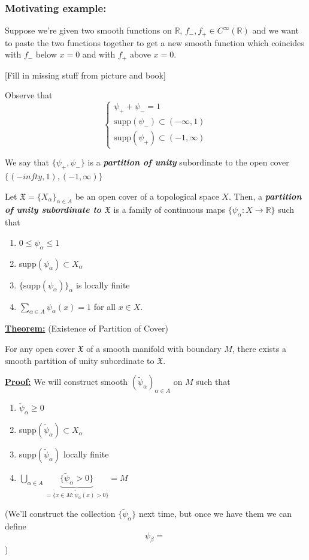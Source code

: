 \documentclass{article}
\newcommand{\R}{\mathbb{R}}
\begin{document}
\subsubsection*{Motivating example:}
Suppose we're given two smooth functions on $\R$, $f_-, f_+ \in C^{\infty}(\R)$ and we want to paste the two functions together to get a new smooth function which coincides with $f_-$ below $x = 0$ and with $f_+$ above $x = 0$.

\vskip 1cm
[Fill in missing stuff from picture and book]

\vskip 1cm
Observe that 
\[ \begin{cases}
  \psi_+ + \psi_- = 1 \\
  \text{supp}(\psi_-) \subset (-\infty, 1) \\
  \text{supp}(\psi_+) \subset (-1, \infty) 
\end{cases} \]

We say that $\{\psi_+, \psi_-\}$ is a \emph{\textbf{partition of unity}} subordinate to the open cover $\{ (-infty, 1), (-1, \infty) \}$

\vskip 1cm
\begin{mathdefinitionbox}{}
  Let $\mathfrak{X} = \{X_{\alpha}\}_{\alpha \in A}$ be an open cover of a topological space $X$. Then, a \emph{\textbf{partition of unity subordinate to $\mathfrak{X}$}} is a family of continuous maps $\{\psi_{\alpha} : X \rightarrow \R \}$ such that 
  \begin{enumerate}
    \item $0 \leq \psi_{\alpha} \leq 1$
    \item supp$(\psi_{\alpha}) \subset X_{\alpha}$
    \item $\{\text{supp}(\psi_{\alpha})\}_{\alpha}$ is locally finite
    \item $\sum_{\alpha \in A} \psi_{\alpha}(x) = 1$ for all $x \in X$.
  \end{enumerate}  
\end{mathdefinitionbox}

\vskip 1cm
\begin{dottedbox}
  \underline{\textbf{Theorem:}} (Existence of Partition of Cover)
  
  For any open cover $\mathfrak{X}$ of a smooth manifold with boundary $M$, there exists a smooth partition of unity subordinate to $\mathfrak{X}$.
\end{dottedbox}

\vskip 0.5cm
\underline{\textbf{Proof:}} We will construct smooth $(\tilde{\psi}_{\alpha})_{\alpha \in A}$ on $M$ such that 
\begin{enumerate}
  \item $\tilde{\psi}_{\alpha} \geq 0$ 
  \item supp$(\tilde{\psi}_{\alpha}) \subset X_{\alpha}$
  \item supp$(\tilde{\psi}_{\alpha})$ locally finite
  \item $\bigcup_{\alpha \in A} \underbrace{\{ \tilde{\psi}_{\alpha} > 0 \}}_{ = \{x \in M : \tilde{\psi}_{\alpha}(x) > 0\}  } = M$ 
\end{enumerate}

(We'll construct the collection $\{ \tilde{\psi}_{\alpha} \}$ next time, but once we have them we can define 
\[ \psi_{\beta} = \frac{}{} \]
) 
\end{document}
